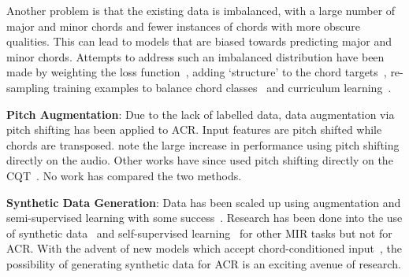 Another problem is that the existing data is imbalanced, with a large number of major and minor chords and fewer instances of chords with more obscure qualities. This can lead to models that are biased towards predicting major and minor chords. Attempts to address such an imbalanced distribution have been made by weighting the loss function~\citep{ACRLargeVocab1}, adding `structure' to the chord targets~\citep{StructuredTraining,ACRLargeVocab1}, re-sampling training examples to balance chord classes~\citep{BalanceRandomForestACR} and curriculum learning~\citep{CurriculumLearning}.

\textbf{Pitch Augmentation}: Due to the lack of labelled data, data augmentation via pitch shifting has been applied to ACR. Input features are pitch shifted while chords are transposed. \citet{StructuredTraining} note the large increase in performance using pitch shifting directly on the audio. Other works have since used pitch shifting directly on the CQT~\citep{ACRLargeVocab1}. No work has compared the two methods.

\textbf{Synthetic Data Generation}: Data has been scaled up using augmentation and semi-supervised learning with some success~\citep{ScalingUpSemiSupervisedLearning}. Research has been done into the use of synthetic data~\citep{MusicGenTrainingData,AnnotationFreeSyntheticData} and self-supervised learning~\citep{MERTSupervisedLearning} for other MIR tasks but not for ACR. With the advent of new models which accept chord-conditioned input~\citep{MusiConGen}, the possibility of generating synthetic data for ACR is an exciting avenue of research.



